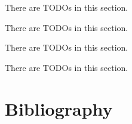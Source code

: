 \documentclass[12pt]{article}
\begin{document}

There are \theTODOcounter\; TODOs in this section.
\setcounter{TODOcounter}{0}


There are \theTODOcounter\; TODOs in this section.
\setcounter{TODOcounter}{0}


There are \theTODOcounter\; TODOs in this section.
\setcounter{TODOcounter}{0}


There are \theTODOcounter\; TODOs in this section.
\setcounter{TODOcounter}{0}




\newpage
\section{Bibliography}
\printbibliography

\printindex
\end{document}
